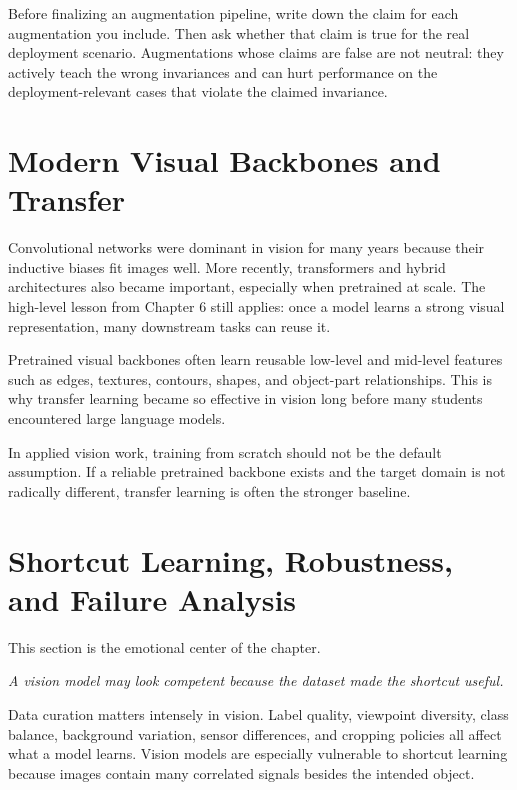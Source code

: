 \begin{practicalnote}
Before finalizing an augmentation pipeline, write down the claim for each augmentation you include. Then ask whether that claim is true for the real deployment scenario. Augmentations whose claims are false are not neutral: they actively teach the wrong invariances and can hurt performance on the deployment-relevant cases that violate the claimed invariance.
\end{practicalnote}

\section{Modern Visual Backbones and Transfer}

Convolutional networks were dominant in vision for many years because their inductive biases fit images well. More recently, transformers and hybrid architectures also became important, especially when pretrained at scale. The high-level lesson from Chapter 6 still applies: once a model learns a strong visual representation, many downstream tasks can reuse it.

Pretrained visual backbones often learn reusable low-level and mid-level features such as edges, textures, contours, shapes, and object-part relationships. This is why transfer learning became so effective in vision long before many students encountered large language models.

\begin{practicalnote}
In applied vision work, training from scratch should not be the default assumption. If a reliable pretrained backbone exists and the target domain is not radically different, transfer learning is often the stronger baseline.
\end{practicalnote}

\section{Shortcut Learning, Robustness, and Failure Analysis}

This section is the emotional center of the chapter.

\begin{center}
\emph{A vision model may look competent because the dataset made the shortcut useful.}
\end{center}

Data curation matters intensely in vision. Label quality, viewpoint diversity, class balance, background variation, sensor differences, and cropping policies all affect what a model learns. Vision models are especially vulnerable to shortcut learning because images contain many correlated signals besides the intended object.

